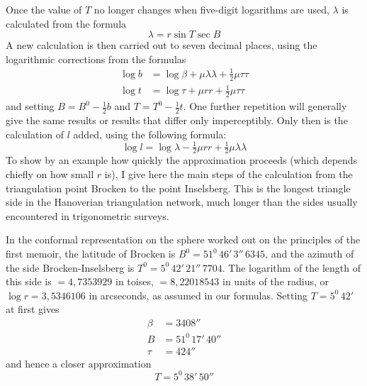 %
Once the value of \(T\) no longer changes when five-digit logarithms are used, \(\lambda\) is calculated from the formula
\[
\lambda=r\sin T\sec B
\]
A new calculation is then carried out to seven decimal places, using the logarithmic corrections from the formulas
\[
\begin{aligned}
\log b&=\log\beta+\mu\lambda\lambda+\tfrac12\mu\tau\tau\\
\log t&=\log\tau+\mu rr+\tfrac12\mu\tau\tau
\end{aligned}
\]
and setting \(B=B^0-\frac12b\) and \(T=T^0-\frac12t\). One further repetition will generally give the same results or results that differ only imperceptibly. Only then is the calculation of \(l\) added, using the following formula:
\[
\log l=\log\lambda-\tfrac12\mu rr+\tfrac12\mu\lambda\lambda
\]
To show by an example how quickly the approximation proceeds (which depends chiefly on how small \(r\) is), I give here the main steps of the calculation from the triangulation point Brocken to the point Inselsberg. This is the longest triangle side in the Hanoverian triangulation network, much longer than the sides usually encountered in trigonometric surveys.

In the conformal representation on the sphere worked out on the principles of the first memoir, the latitude of Brocken is \(B^0=51^0\,46'\,3''\,6345\), and the azimuth of the side Brocken-Inselsberg is \(T^0=5^0\,42'\,21''\,7704\). The logarithm of the length of this side is \(=4{,}7353929\) in toises, \(=8{,}22018543\) in units of the radius, or \(\log r=3{,}5346106\) in arcseconds, as assumed in our formulas. Setting \(T=5^0\,42'\) at first gives
\[
\begin{aligned}
\beta&=3408''\\
B&=51^0\,17'\,40''\\
\tau&=424''
\end{aligned}
\]
and hence a closer approximation
\[
T=5^0\,38'\,50''
\]
